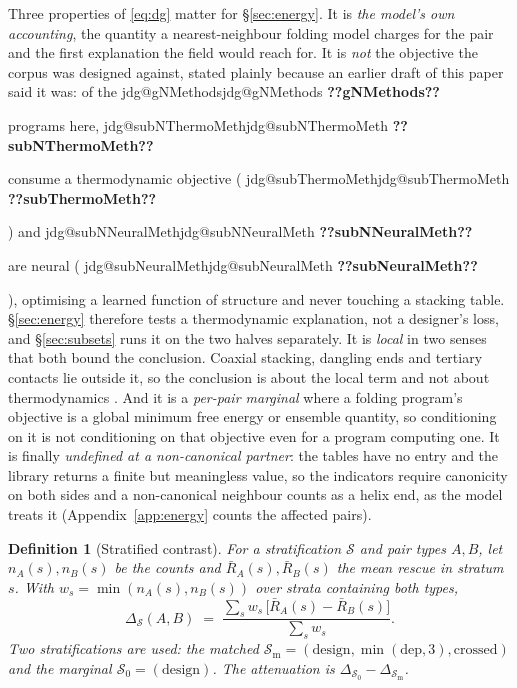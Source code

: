 \documentclass[11pt]{article}
\makeatletter
\newtheorem{definition}{Definition}
\newcommand{\jdg}[1]{%
  \ifcsname jdg@#1\endcsname\csname jdg@#1\endcsname
  \else\textbf{??#1??}\PackageError{rna}{undefined measured quantity #1}{}\fi}
\makeatother
\begin{document}
\noindent Three properties of \eqref{eq:dg} matter for \S\ref{sec:energy}. It is \emph{the model's
own accounting}, the quantity a nearest-neighbour folding model charges for the pair and the first
explanation the field would reach for. It is \emph{not} the objective the corpus was designed
against, stated plainly because an earlier draft of this paper said it was: of the
\jdg{gNMethods} programs here, \jdg{subNThermoMeth} consume a thermodynamic objective
(\jdg{subThermoMeth}) and \jdg{subNNeuralMeth} are neural (\jdg{subNeuralMeth}), optimising a
learned function of structure and never touching a stacking table. \S\ref{sec:energy} therefore
tests a thermodynamic explanation, not a designer's loss, and \S\ref{sec:subsets} runs it on the
two halves separately. It is \emph{local} in two senses that both bound the conclusion. Coaxial
stacking, dangling ends and tertiary contacts lie outside it, so the conclusion is about the local
term and not about thermodynamics \citep{walter1994coaxial,serra1995predicting}. And it is a \emph{per-pair marginal} where a folding program's objective is a global minimum free
energy or ensemble quantity, so conditioning on it is not conditioning on that objective even for a
program computing one. It is finally \emph{undefined at a non-canonical partner}: the tables have no entry and the library
returns a finite but meaningless value, so the indicators require canonicity on both sides and a
non-canonical neighbour counts as a helix end, as the model treats it (Appendix~\ref{app:energy} counts the affected pairs).

\begin{definition}[Stratified contrast]
\label{def:contrast}
For a stratification $\mathcal{S}$ and pair types $A,B$, let $n_A(s),n_B(s)$ be the counts and
$\bar R_A(s),\bar R_B(s)$ the mean rescue in stratum $s$. With $w_s=\min(n_A(s),n_B(s))$ over
strata containing both types,
\begin{equation}
\Delta_{\mathcal S}(A,B) \;=\;
\frac{\sum_s w_s\,\bigl[\bar R_A(s)-\bar R_B(s)\bigr]}{\sum_s w_s}.
\label{eq:contrast}
\end{equation}
Two stratifications are used: the \emph{matched}
$\mathcal{S}_{\mathrm m}=(\text{design},\min(\mathrm{dep},3),\text{crossed})$ and the
\emph{marginal} $\mathcal{S}_{0}=(\text{design})$. The attenuation is
$\Delta_{\mathcal S_0}-\Delta_{\mathcal S_{\mathrm m}}$.
\end{definition}
\end{document}
